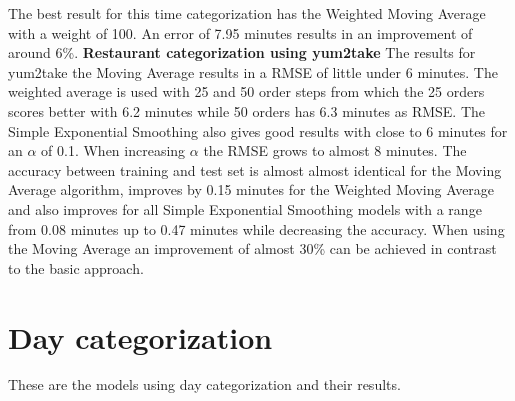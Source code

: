 The best result for this time categorization has the Weighted Moving Average with a weight of 100. An error of 7.95 minutes results in an improvement of around 6\%.
\newline\newline\textbf{Restaurant categorization using yum2take}\newline
The results for yum2take the Moving Average results in a RMSE of little under 6 minutes. The weighted average is used with 25 and 50 order steps from which the 25 orders scores better with 6.2 minutes while 50 orders has 6.3 minutes as RMSE. The Simple Exponential Smoothing also gives good results with close to 6 minutes for an $\alpha$ of 0.1. When increasing $\alpha$ the RMSE grows to almost 8 minutes. The accuracy between training and test set is almost almost identical for the Moving Average algorithm, improves by 0.15 minutes for the Weighted Moving Average and also improves for all Simple Exponential Smoothing models with a range from 0.08 minutes up to 0.47 minutes while decreasing the accuracy.\newline
When using the Moving Average an improvement of almost 30\% can be achieved in contrast to the basic approach.
\section{Day categorization}\label{section:Day categorization}
These are the models using day categorization and their results.
